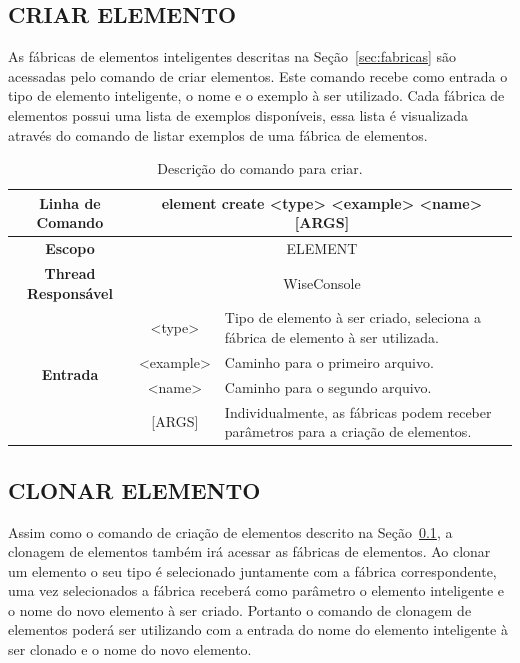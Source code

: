 \documentclass[a4paper,12pt]{monografia}
\theoremstyle{plain}
\theoremstyle{definition}
\theoremstyle{remark}
\begin{document}
\subsection{CRIAR ELEMENTO}\label{sec:create_element}

As fábricas de elementos inteligentes descritas na Seção~\ref{sec:fabricas} são acessadas pelo comando de criar elementos. Este comando recebe como entrada o tipo de elemento inteligente, o nome e o exemplo à ser utilizado. Cada fábrica de elementos possui uma lista de exemplos disponíveis, essa lista é visualizada através do comando de listar exemplos de uma fábrica de elementos.

\begin{center}
\begin{table}[!htbp]
	\begin{tabular}{|c|c|m{}|}
		\hline
		\textbf{Linha de Comando} & \multicolumn{2}{c|}{element create <type> <example> <name> [ARGS]} \\
		\hline
		\textbf{Escopo} & \multicolumn{2}{c|}{ELEMENT} \\
		\hline
		\textbf{Thread Responsável} & \multicolumn{2}{c|}{WiseConsole} \\
		\hline
		\multirow{4}{*}{\textbf{Entrada}} & <type> & Tipo de elemento à ser criado, seleciona a fábrica de elemento à ser utilizada. \\
		
		& <example> & Caminho para o primeiro arquivo. \\
		& <name> & Caminho para o segundo arquivo. \\
		& [ARGS] & Individualmente,  as fábricas podem receber parâmetros para a criação de elementos. \\
		\hline
	\end{tabular}
	\caption{Descrição do comando para criar.}
	\label{tab:create_element}
\end{table}
\end{center}

\subsection{CLONAR ELEMENTO}\label{sec:clone_element}

Assim como o comando de criação de elementos descrito na Seção~\ref{sec:create_element}, a clonagem de elementos também irá acessar as fábricas de elementos. Ao clonar um elemento o seu tipo é selecionado juntamente com a fábrica correspondente, uma vez selecionados a fábrica receberá como parâmetro o elemento inteligente e o nome do novo elemento à ser criado. Portanto o comando de clonagem de elementos poderá ser utilizando com a entrada do nome do elemento inteligente à ser clonado e o nome do novo elemento.
\end{document}
